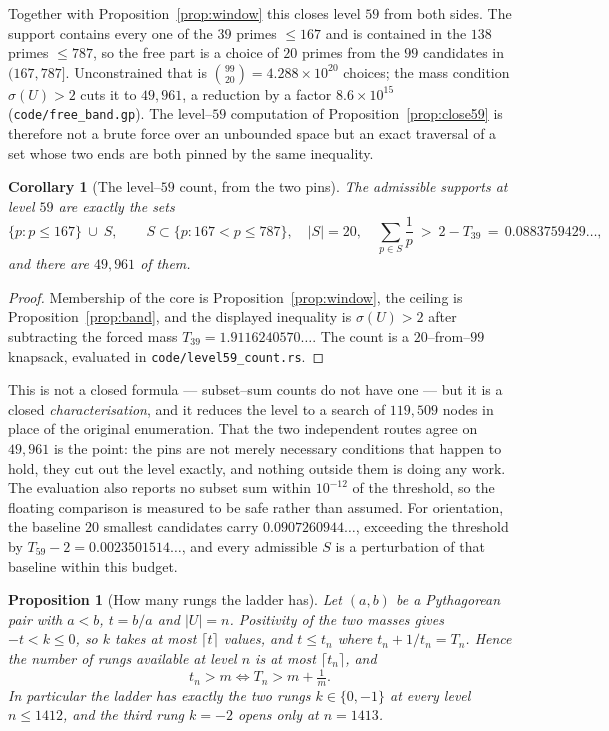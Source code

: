 \documentclass[11pt]{article}
\newtheorem{proposition}[theorem]{Proposition}
\newtheorem{corollary}[theorem]{Corollary}
\theoremstyle{definition}
\begin{document}
Together with Proposition~\ref{prop:window} this closes level $59$ from both sides. The support
contains every one of the $39$ primes $\le167$ and is contained in the $138$ primes $\le787$, so the
free part is a choice of $20$ primes from the $99$ candidates in $(167,787]$. Unconstrained that is
$\binom{99}{20}=4.288\times10^{20}$ choices; the mass condition $\sigma(U)>2$ cuts it to $49{,}961$,
a reduction by a factor $8.6\times10^{15}$ \textup{(\texttt{code/free\_band.gp})}. The level--$59$
computation of Proposition~\ref{prop:close59} is therefore not a brute force over an unbounded space
but an exact traversal of a set whose two ends are both pinned by the same inequality.

\begin{corollary}[The level--$59$ count, from the two pins]\label{cor:count59}
The admissible supports at level $59$ are exactly the sets
\[ \{p:p\le167\}\ \cup\ S, \qquad S\subset\{p:167<p\le787\},\quad |S|=20,\quad
   \sum_{p\in S}\frac1p\ >\ 2-T_{39}\,=\,0.0883759429\ldots, \]
and there are $49{,}961$ of them.
\end{corollary}
\begin{proof}
Membership of the core is Proposition~\ref{prop:window}, the ceiling is Proposition~\ref{prop:band},
and the displayed inequality is $\sigma(U)>2$ after subtracting the forced mass
$T_{39}=1.9116240570\ldots$. The count is a $20$--from--$99$ knapsack, evaluated in
\texttt{code/level59\_count.rs}.
\end{proof}

This is not a closed formula --- subset--sum counts do not have one --- but it is a closed
\emph{characterisation}, and it reduces the level to a search of $119{,}509$ nodes in place of the
original enumeration. That the two independent routes agree on $49{,}961$ is the point: the pins are
not merely necessary conditions that happen to hold, they cut out the level exactly, and nothing
outside them is doing any work. The evaluation also reports no subset sum within $10^{-12}$ of the
threshold, so the floating comparison is measured to be safe rather than assumed. For orientation,
the baseline $20$ smallest candidates carry $0.0907260944\ldots$, exceeding the threshold by
$T_{59}-2=0.0023501514\ldots$, and every admissible $S$ is a perturbation of that baseline within
this budget.

\begin{proposition}[How many rungs the ladder has]\label{prop:rungcount}
Let $(a,b)$ be a Pythagorean pair with $a<b$, $t=b/a$ and $|U|=n$. Positivity of the two masses gives
$-t<k\le0$, so $k$ takes at most $\lceil t\rceil$ values, and $t\le t_n$ where $t_n+1/t_n=T_n$. Hence
the number of rungs available at level $n$ is at most $\lceil t_n\rceil$, and
\[ t_n>m\iff T_n>m+\tfrac1m . \]
In particular the ladder has exactly the two rungs $k\in\{0,-1\}$ at every level $n\le1412$, and the
third rung $k=-2$ opens only at $n=1413$.
\end{proposition}
\end{document}
